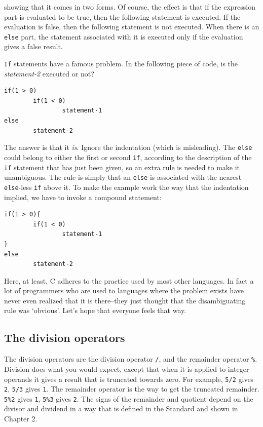    showing that it comes in two forms. Of course, the effect is that if the
    expression part is evaluated to be true, then the following statement is
    executed. If the evaluation is false, then the following statement is not
    executed. When there is an \texttt{else} part, the statement associated
    with it is executed only if the evaluation gives a false result.


   \texttt{If} statements have a famous problem. In the following piece
    of code, is the \textit{statement-2} executed or not?


   \begin{Verbatim}
if(1 > 0)
        if(1 < 0)
                statement-1
else
        statement-2
\end{Verbatim}

   The answer is that it \textit{is}. Ignore the indentation (which is
    misleading). The \texttt{else} could belong to either the first or
    second \texttt{if}, according to the description of the \texttt{if}
    statement that has just been given, so an extra rule is needed to make it
    unambiguous. The rule is simply that an \texttt{else} is associated
    with the nearest \texttt{else}-less \texttt{if} above it. To make
    the example work the way that the indentation implied, we have to invoke a
    compound statement:


   \begin{Verbatim}
if(1 > 0){
        if(1 < 0)
                statement-1
}
else
        statement-2
\end{Verbatim}

   Here, at least, C adheres to the practice used by most other languages.
    In fact a lot of programmers who are used to languages where the problem
    exists have never even realized that it is there--they just thought
    that the disambiguating rule was `obvious'. Let's hope that
    everyone feels that way.


  

  \subsection{The division operators}
   

   
   The division operators are the division operator \texttt{/}, and the
    remainder operator \texttt{\%}. Division does what you would expect,
    except that when it is applied to integer operands it gives a result that
    is truncated towards zero. For example, \texttt{5/2} gives
    \texttt{2}, \texttt{5/3} gives \texttt{1}. The remainder
    operator is the way to get the truncated remainder. \texttt{5\%2} gives
    \texttt{1}, \texttt{5\%3} gives \texttt{2}. The signs of the
    remainder and quotient depend on the divisor and dividend in a way that is
    defined in the Standard and shown in Chapter 2.


